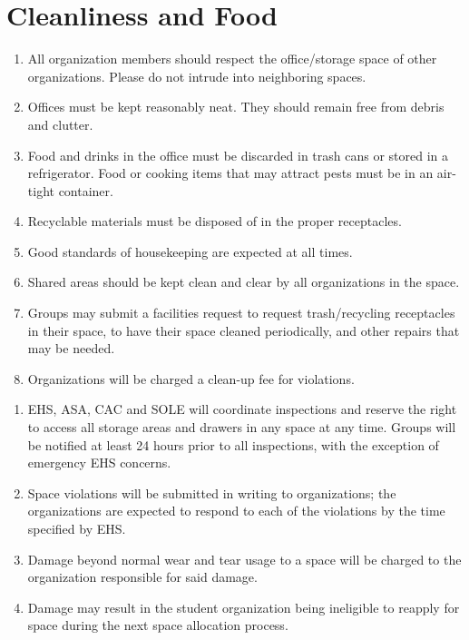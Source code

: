 \documentclass[12pt]{constitution}
\begin{document}
\section{Cleanliness and Food}
\begin{enumerate}
    \item All organization members should respect the office/storage space of other organizations.
    Please do not intrude into neighboring spaces.

    \item Offices must be kept reasonably neat.
    They should remain free from debris and clutter.
    
    \item Food and drinks in the office must be discarded in trash cans or stored in a refrigerator.
    Food or cooking items that may attract pests must be in an air-tight container.

    \item Recyclable materials must be disposed of in the proper receptacles.
    
    \item Good standards of housekeeping are expected at all times.
    
    \item Shared areas should be kept clean and clear by all organizations in the space.
    
    \item Groups may submit a facilities request to request trash/recycling receptacles in their space,
        to have their space cleaned periodically, and other repairs that may be needed.

    \item Organizations will be charged a clean-up fee for violations.
\end{enumerate}

\begin{enumerate}
    \item EHS, ASA, CAC and SOLE will coordinate inspections and reserve the right to access all
        storage areas and drawers in any space at any time.
    Groups will be notified at least 24 hours prior to all inspections, with the exception of
        emergency EHS concerns.
    
    \item Space violations will be submitted in writing to organizations; the organizations are
        expected to respond to each of the violations by the time specified by EHS.
    
    \item Damage beyond normal wear and tear usage to a space will be charged to the
        organization responsible for said damage.
    
    \item Damage may result in the student organization being ineligible to reapply for space
        during the next space allocation process.
\end{enumerate}
\end{document}
